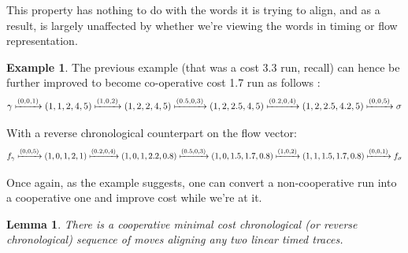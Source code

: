 \documentclass{article}
\newtheorem{lemma}[theorem]{Lemma}
\theoremstyle{Definition}
\theoremstyle{definition}
\newtheorem{example}{Example}
\begin{document}
	This property has nothing to do with the words it is trying to align, and as a result, is largely unaffected by whether we're viewing the words in timing or flow representation. 
	
	\begin{example}The previous example (that was a cost 3.3 run, recall) can hence be further improved to become co-operative cost 1.7 run as follows : 
		$$\gamma \xmapsto{(0, 0, 1)} (1, 1, 2, 4, 5) \xmapsto{(1, 0, 2)} (1, 2, 2, 4, 5) \xmapsto{(0.5, 0, 3)} (1, 2, 2.5, 4, 5) \xmapsto{(0.2, 0, 4)} (1, 2, 2.5, 4.2, 5) \xmapsto{(0, 0, 5)} \sigma $$
		
		With a reverse chronological counterpart on the flow vector: 
		$$f_\gamma \xmapsto{(0, 0, 5)} (1, 0, 1, 2, 1) \xmapsto{(0.2, 0, 4)} (1, 0, 1, 2.2, 0.8) \xmapsto{(0.5, 0, 3)} (1, 0, 1.5, 1.7, 0.8) \xmapsto{(1, 0, 2)} (1, 1, 1.5, 1.7, 0.8) \xmapsto{(0, 0, 1)} f_\sigma $$
		
	\end{example}

	Once again, as the example suggests, one can convert a non-cooperative run into a cooperative one and improve cost while we're at it. 
	
	\begin{lemma}\label{linescoop} There is a cooperative minimal cost chronological (or reverse chronological) sequence of moves aligning any two linear timed traces. 
	\end{lemma}
\end{document}
